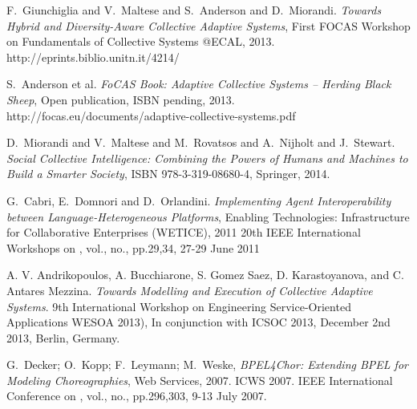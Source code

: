 \documentclass{llncs}
\begin{document}
\begin{thebibliography}{1}


F.~Giunchiglia and V.~Maltese and S.~Anderson and D.~Miorandi. \emph{Towards Hybrid and Diversity-Aware Collective Adaptive Systems}, First FOCAS Workshop on Fundamentals of Collective Systems @ECAL, 2013. http://eprints.biblio.unitn.it/4214/

S.~Anderson et al. \emph{FoCAS Book: Adaptive Collective Systems – Herding Black Sheep}, Open publication, ISBN pending, 2013. http://focas.eu/documents/adaptive-collective-systems.pdf

D.~Miorandi and V.~Maltese and M.~Rovatsos and A.~Nijholt and J.~Stewart. \emph{Social Collective Intelligence: Combining the Powers of Humans and Machines to Build a Smarter Society}, ISBN 978-3-319-08680-4, Springer, 2014.





G.~Cabri, E.~Domnori and D.~Orlandini. \emph{Implementing Agent Interoperability between Language-Heterogeneous Platforms}, Enabling Technologies: Infrastructure for Collaborative Enterprises (WETICE), 2011 20th IEEE International Workshops on , vol., no., pp.29,34, 27-29 June 2011



A. V. Andrikopoulos, A. Bucchiarone, S. Gomez Saez, D. Karastoyanova, and C. Antares Mezzina. \emph{Towards Modelling and Execution of Collective Adaptive Systems}. 9th International Workshop on Engineering Service-Oriented Applications WESOA 2013), In conjunction with ICSOC 2013, December 2nd 2013, Berlin, Germany.

G.~Decker; O.~Kopp; F.~Leymann; M.~Weske, \emph{BPEL4Chor: Extending BPEL for Modeling Choreographies}, Web Services, 2007. ICWS 2007. IEEE International Conference on , vol., no., pp.296,303, 9-13 July 2007.


\end{thebibliography}
\end{document}
